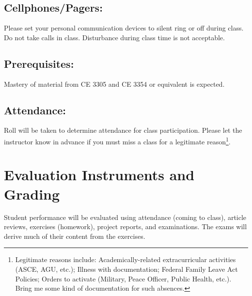 \documentclass[12pt]{article}
\begin{document}
\subsection*{Cellphones/Pagers: }
Please set your personal communication devices to silent ring or off during class. 
Do not take calls in class. Disturbance during class time is not acceptable.

\subsection*{Prerequisites:} 
Mastery of material from CE 3305 and CE 3354 or equivalent is expected.

\subsection*{Attendance:} Roll will be taken to determine attendance for class participation.  Please let the instructor know in advance if you must miss a class for a legitimate reason\footnote{Legitimate reasons include: Academically-related extracurricular activities (ASCE, AGU, etc.); Illness with documentation; Federal Family Leave Act Policies; Orders to activate (Military, Peace Officer, Public Health, etc.).  Bring me some kind of documentation for such absences.}. 

\section*{Evaluation Instruments and Grading}
Student performance will be evaluated using attendance (coming to class), article reviews, exercises (homework), project reports, and examinations.   The exams will derive much of their content from the exercises.  %

\end{document}
